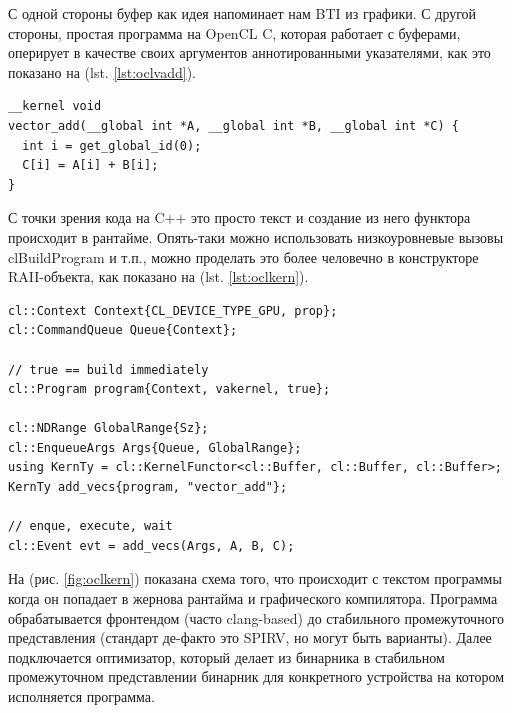 \documentclass[a4paper,12pt,oneside]{article}
\begin{document}
С одной стороны буфер как идея напоминает нам BTI из графики. С другой стороны, простая программа на OpenCL C, которая работает с буферами, оперирует в качестве своих аргументов аннотированными указателями, как это показано на (lst. \ref{lst:oclvadd}).

\begin{lstlisting}[caption={Векторное сложение, OpenCL},label={lst:oclvadd}]
__kernel void
vector_add(__global int *A, __global int *B, __global int *C) {
  int i = get_global_id(0);
  C[i] = A[i] + B[i];
}
\end{lstlisting}

С точки зрения кода на C++ это просто текст и создание из него функтора происходит в рантайме.
Опять-таки можно использовать низкоуровневые вызовы clBuildProgram и т.п., можно проделать это более человечно в конструкторе RAII-объекта, как показано на (lst. \ref{lst:oclkern}).

\begin{lstlisting}[caption={Создание кернела, OpenCL},label={lst:oclkern}]
cl::Context Context{CL_DEVICE_TYPE_GPU, prop};
cl::CommandQueue Queue{Context};

// true == build immediately
cl::Program program{Context, vakernel, true};

cl::NDRange GlobalRange{Sz};
cl::EnqueueArgs Args{Queue, GlobalRange};
using KernTy = cl::KernelFunctor<cl::Buffer, cl::Buffer, cl::Buffer>;
KernTy add_vecs{program, "vector_add"};

// enque, execute, wait
cl::Event evt = add_vecs(Args, A, B, C);
\end{lstlisting}

На (рис. \ref{fig:oclkern}) показана схема того, что происходит с текстом программы когда он попадает в жернова рантайма и графического компилятора.
Программа обрабатывается фронтендом (часто clang-based) до стабильного промежуточного представления (стандарт де-факто это SPIRV, но могут быть варианты).
Далее подключается оптимизатор, который делает из бинарника в стабильном промежуточном представлении бинарник для конкретного устройства на котором исполняется программа.
\end{document}

